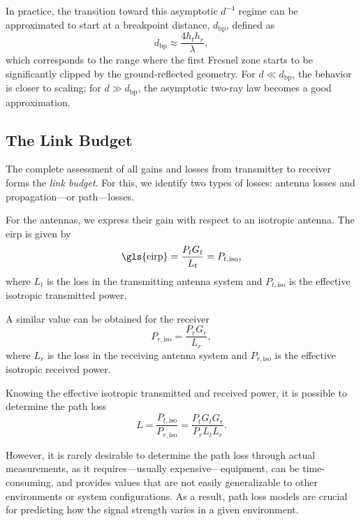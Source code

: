 In practice, the transition toward this asymptotic $d^{-4}$ regime can be approximated to start at a breakpoint distance, $d_{\mathrm{bp}}$, defined as
\begin{equation}
  d_{\mathrm{bp}} \approx \frac{4 h_t h_r}{\lambda},
\end{equation}
which corresponds to the range where the first Fresnel zone starts to be significantly clipped by the ground-reflected geometry. For $d \ll d_{\mathrm{bp}}$, the behavior is closer to  scaling; for $d \gg d_{\mathrm{bp}}$, the asymptotic two-ray law becomes a good approximation.

\subsection{The Link Budget}

The complete assessment of all gains and losses from transmitter to receiver forms the \emph{link budget}. For this, we identify two types of losses: antenna losses and propagation---or path---losses.

For the antennas, we express their gain with respect to an isotropic antenna. The \gls{eirp} is given by
\begin{equation}
  \text{\gls{eirp}} = \frac{P_t G_t}{L_t} = P_{t,\text{iso}},
\end{equation}
where $L_t$ is the loss in the transmitting antenna system and $P_{t,\text{iso}}$ is the effective isotropic transmitted power.

A similar value can be obtained for the receiver
\begin{equation}
  P_{r,\text{iso}} = \frac{P_r G_r}{L_r},
\end{equation}
where $L_r$ is the loss in the receiving antenna system and $P_{r,\text{iso}}$ is the effective isotropic received power.

Knowing the effective isotropic transmitted and received power, it is possible to determine the path loss
\begin{equation}
  L = \frac{P_{t,\text{iso}}}{P_{r,\text{iso}}} = \frac{P_t G_t G_r}{P_r L_t L_r}.
\end{equation}

However, it is rarely desirable to determine the path loss through actual measurements, as it requires---usually expensive---equipment, can be time-consuming, and provides values that are not easily generalizable to other environments or system configurations. As a result, path loss models are crucial for predicting how the signal strength varies in a given environment.

